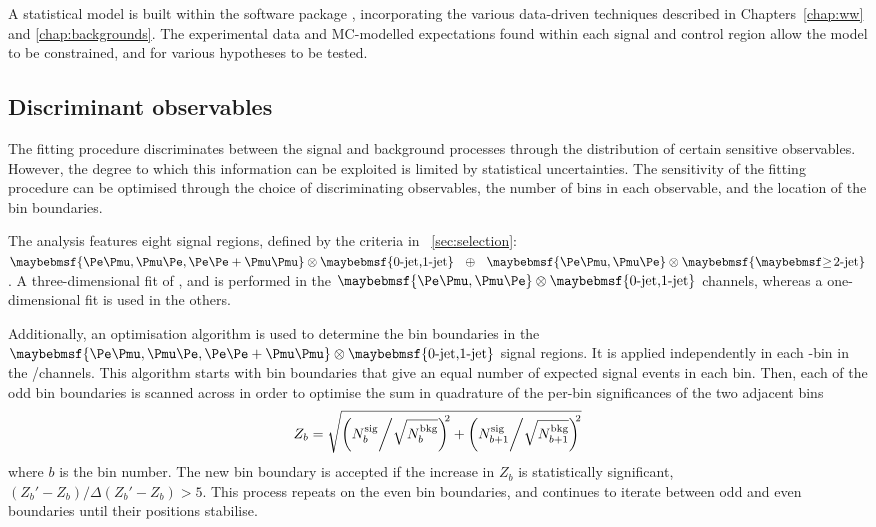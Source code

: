 
A statistical model is built within the \histfactory software package \cite{HistFactory}, 
incorporating the various data-driven techniques described in Chapters~\ref{chap:ww} and 
\ref{chap:backgrounds}. The experimental data and MC-modelled expectations found within each 
signal and control region allow the model to be constrained, and for various hypotheses to 
be tested.



\subsection{Discriminant observables}
\label{sec:stat:sr_binning}

The fitting procedure discriminates between the signal and background processes through the 
distribution of certain sensitive observables. However, the degree to which this information 
can be exploited is limited by statistical uncertainties. The sensitivity of the fitting 
procedure can be optimised through the choice of discriminating observables, the number of 
bins in each observable, and the location of the bin boundaries.

The analysis features eight signal regions, defined by the criteria in 
\Section~\ref{sec:selection}: $\braces{\emch,\mech,\eech{}+\mmch} \otimes 
\braces{\text{0-jet,1-jet}}~~\oplus~~\braces{\emch,\mech} \otimes \braces{\twojet}$.
A three-dimensional fit of \mt, \ptsubleadlep and \mll is performed in the 
$\braces{\emch,\mech} \otimes \braces{\text{0-jet,1-jet}}$ channels, whereas a 
one-dimensional \mt fit is used in the others.

Additionally, an optimisation algorithm is used to determine the \mt bin boundaries in the 
$\braces{\emch,\mech,\eech{}+\mmch} \otimes \braces{\text{0-jet,1-jet}}$ signal regions. 
It is applied independently in each \ptsubleadlep-\mll bin in the \emch/\mech channels. 
This algorithm starts with bin boundaries that give an equal number of expected signal 
events in each bin. Then, each of the odd bin boundaries is scanned across \mt in order to 
optimise the sum in quadrature of the per-bin significances of the two adjacent bins
\begin{equation}
	Z_b = \sqrt{\left(N_{b}^{\text{sig}} \middle/ \sqrt{N_{b}^{\text{bkg}}}\right)^{\!\!2} + \left(N_{b+1}^{\text{sig}} \middle/ \sqrt{N_{b+1}^{\text{bkg}}}\right)^{\!\!2}}
\end{equation}
where $b$ is the bin number. The new bin boundary is accepted if the increase in $Z_b$ is 
statistically significant, \ie $(Z_b' - Z_b)/\Delta(Z_b' - Z_b) > 5$. This process repeats 
on the even bin boundaries, and continues to iterate between odd and even boundaries until 
their positions stabilise.

